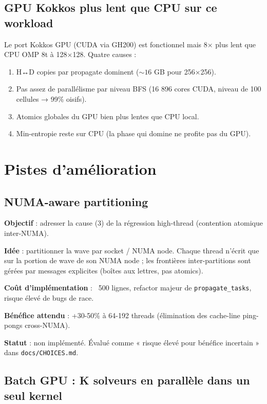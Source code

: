\subsection{GPU Kokkos plus lent que CPU sur ce workload}

Le port Kokkos GPU (CUDA via GH200) est fonctionnel mais 8× plus lent que CPU OMP 8t à 128×128. Quatre causes :
\begin{enumerate}
    \item H↔D copies par propagate dominent ($\sim 16$ GB pour 256×256).
    \item Pas assez de parallélisme par niveau BFS (16 896 cores CUDA, niveau de 100 cellules → 99\% oisifs).
    \item Atomics globales du GPU bien plus lentes que CPU local.
    \item Min-entropie reste sur CPU (la phase qui domine ne profite pas du GPU).
\end{enumerate}

\section{Pistes d'amélioration}
\label{sec:limites:perspectives}

\subsection{NUMA-aware partitioning}

\textbf{Objectif} : adresser la cause (3) de la régression high-thread (contention atomique inter-NUMA).

\textbf{Idée} : partitionner la wave par socket / NUMA node. Chaque thread n'écrit que sur la portion de wave de son NUMA node ; les frontières inter-partitions sont gérées par messages explicites (boîtes aux lettres, pas atomics).

\textbf{Coût d'implémentation} : ~500 lignes, refactor majeur de \texttt{propagate\_tasks}, risque élevé de bugs de race.

\textbf{Bénéfice attendu} : +30-50\% à 64-192 threads (élimination des cache-line ping-pongs cross-NUMA).

\textbf{Statut} : non implémenté. Évalué comme « risque élevé pour bénéfice incertain » dans \texttt{docs/CHOICES.md}.

\subsection{Batch GPU : K solveurs en parallèle dans un seul kernel}

